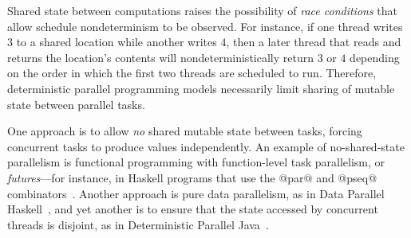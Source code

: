\documentclass{article}
\begin{document}
Shared state between computations raises the possibility of \emph{race
  conditions} that allow schedule nondeterminism to be observed.  For
instance, if one thread writes $3$ to a shared location while another
writes $4$, then a later thread that reads and returns the location's
contents will nondeterministically return $3$ or $4$ depending on the
order in which the first two threads are scheduled to run.  Therefore,
deterministic parallel programming models necessarily limit sharing of
mutable state between parallel tasks.

One approach is to allow \emph{no} shared mutable state between tasks,
forcing concurrent tasks to produce values independently.  An example
of no-shared-state parallelism is functional programming with
function-level task parallelism, or \emph{futures}---for instance, in
Haskell programs that use the @par@ and @pseq@
combinators~\cite{marlow-par}.  Another approach is pure data
parallelism, as in Data Parallel Haskell~\cite{dph}, and yet another
is to ensure that the state accessed by concurrent threads is
disjoint, as in Deterministic Parallel Java~\cite{dpj-oopsla}.
\end{document}

